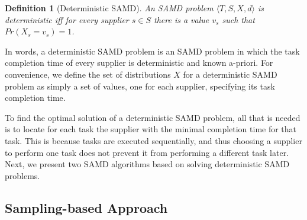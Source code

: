 \documentclass[letterpaper]{article} %
\newtheorem{definition}{Definition}
\newcommand{\tuple}[1]{\langle#1\rangle}
\newcommand{\samd}{\ac{SAMD}\xspace}
\newcommand{\sampling}{\textsc{Sampling}\xspace}
\begin{document}
\begin{definition}[Deterministic \samd]
An \samd problem $\tuple{T, S, X, d}$ is \emph{deterministic}
iff for every supplier $s\in S$ there is a value $v_s$ such that $Pr(X_s=v_s)=1$.
\label{def:deterministic}
\end{definition}
In words, a deterministic \samd problem is an \samd problem in which the task completion time of every supplier is deterministic and known a-priori. %
For convenience, we define the set of distributions $X$
for a deterministic \samd problem as simply a set of values, one for each supplier, specifying its task completion time. %

To find the optimal solution of a deterministic \samd problem, all that is needed is to locate for each task the supplier with the minimal completion time for that task. This is because tasks are executed sequentially, and thus choosing a supplier to perform one task does not prevent it from performing a different task later. Next, we present two \samd algorithms based on solving deterministic \samd problems.




\subsection{Sampling-based Approach}\label{sec:sampling}


\end{document}
